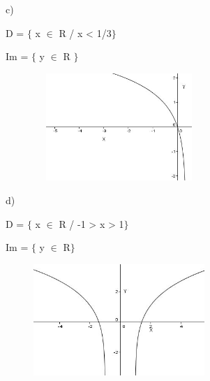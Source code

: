 \documentclass[12pt]{article}
\begin{document}

\par


\vspace{\baselineskip}
\setlength{\parskip}{6.0pt}
c)\par

D = $ \{ $ x $ \in $ R / x < 1/3$ \} $ \par

Im = $ \{ $  y $ \in $ R $ \} $ \par




\begin{figure}[H]
	\begin{Center}
		\includegraphics[width=2.55in,height=1.6in]{./media/image36.JPG}
	\end{Center}
\end{figure}



\par

d)\par

D = $ \{ $  x $ \in $ R / -1 > x > 1$ \} $ \par

Im = $ \{ $  y $ \in $ R$ \} $ \par




\begin{figure}[H]
	\begin{Center}
		\includegraphics[width=2.55in,height=1.66in]{./media/image37.JPG}
	\end{Center}
\end{figure}
\end{document}
